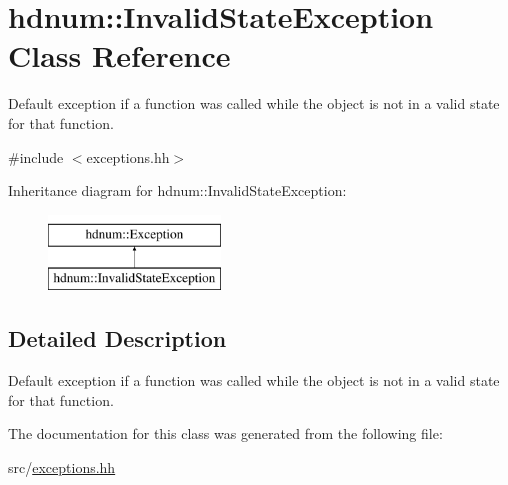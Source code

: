\hypertarget{classhdnum_1_1InvalidStateException}{
\section{hdnum::InvalidStateException Class Reference}
\label{classhdnum_1_1InvalidStateException}
}


Default exception if a function was called while the object is not in a valid state for that function.  




{\ttfamily \#include $<$exceptions.hh$>$}

Inheritance diagram for hdnum::InvalidStateException:\begin{figure}[H]
\begin{center}
\leavevmode
\includegraphics[height=2cm]{classhdnum_1_1InvalidStateException}
\end{center}
\end{figure}


\subsection{Detailed Description}
Default exception if a function was called while the object is not in a valid state for that function. 

The documentation for this class was generated from the following file:\begin{DoxyCompactItemize}
\item 
src/\hyperlink{exceptions_8hh}{exceptions.hh}\end{DoxyCompactItemize}

